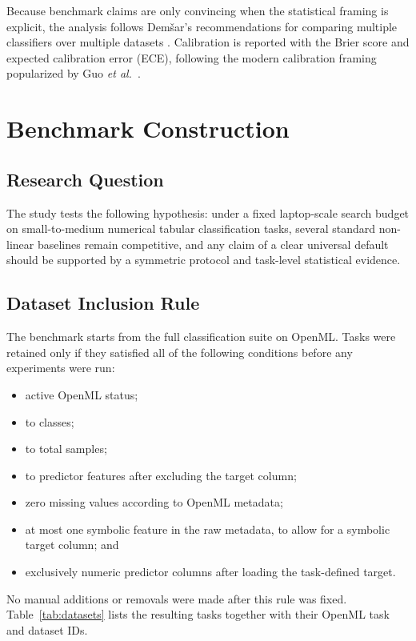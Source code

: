 \documentclass{ieeeaccess}
\begin{document}
Because benchmark claims are only convincing when the statistical framing is explicit, the analysis follows Dem\v{s}ar's recommendations for comparing multiple classifiers over multiple datasets \cite{demsar2006}. Calibration is reported with the Brier score \cite{brier1950} and expected calibration error (ECE), following the modern calibration framing popularized by Guo \emph{et al.}\ \cite{guo2017}.

\section{Benchmark Construction}
\subsection{Research Question}
The study tests the following hypothesis: under a fixed laptop-scale search budget on small-to-medium numerical tabular classification tasks, several standard non-linear baselines remain competitive, and any claim of a clear universal default should be supported by a symmetric protocol and task-level statistical evidence.

\subsection{Dataset Inclusion Rule}
The benchmark starts from the full \BenchmarkSuiteName{} classification suite on OpenML. Tasks were retained only if they satisfied all of the following conditions before any experiments were run:
\begin{itemize}
\item active OpenML status;
\item \MinClasses{} to \MaxClasses{} classes;
\item \MinInstances{} to \MaxInstances{} total samples;
\item \MinFeatures{} to \MaxFeatures{} predictor features after excluding the target column;
\item zero missing values according to OpenML metadata;
\item at most one symbolic feature in the raw metadata, to allow for a symbolic target column; and
\item exclusively numeric predictor columns after loading the task-defined target.
\end{itemize}
No manual additions or removals were made after this rule was fixed. Table~\ref{tab:datasets} lists the resulting tasks together with their OpenML task and dataset IDs.
\end{document}
